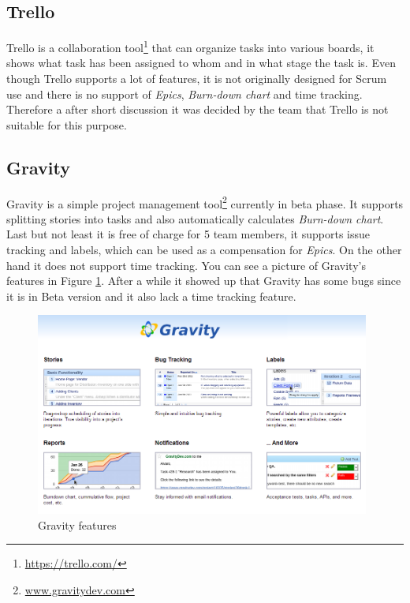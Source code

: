 
\subsection{Trello}
\label{subsec:TrelloToolDescription}
Trello is a collaboration tool\footnote{\url{https://trello.com/}} that can organize tasks into various boards, it shows what task has been assigned to whom and in what stage the task is.
Even though Trello supports a lot of features, it is not originally designed for Scrum use and there is no support of \emph{Epics}, \emph{Burn-down chart} and time tracking. 
Therefore a after short discussion it was decided by the team that Trello is not suitable for this purpose.


\subsection{Gravity} 
\label{subsec:GravityToolDescription}
Gravity is a simple project management tool\footnote{\url{www.gravitydev.com}} currently in beta phase.
It supports splitting stories into tasks and also automatically calculates \emph{Burn-down chart}. 
Last but not least it is free of charge for 5 team members, it supports issue tracking and labels, which can be used as a compensation for \emph{Epics}.
On the other hand it does not support time tracking.
You can see a picture of Gravity's features in Figure \ref{fig:gravity}. After a while it showed up that Gravity has some bugs since it is in Beta version and it also lack a time tracking feature.

\begin{figure}[!h]
	\centering
		\includegraphics[width=11cm]{preliminaryStudies/gravity.png}
	\caption{Gravity features}
	\label{fig:gravity}
\end{figure}

